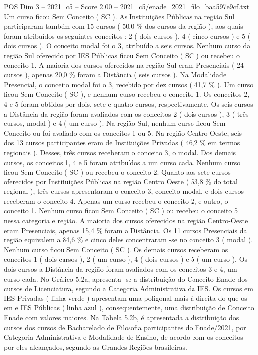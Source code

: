 \begin{textsample}{POS Dim 3 – 2021\_c5 – Score 2.00 – 2021\_c5/enade\_2021\_filo\_baa597e9cf.txt}
Um curso ficou Sem Conceito ( SC ).
As Instituições Públicas na região Sul participaram também com 15 cursos ( 50,0 \% dos cursos da região ), aos quais foram atribuídos os seguintes conceitos : 2 ( dois cursos ), 4 ( cinco cursos ) e 5 ( dois cursos ).
O conceito modal foi o 3, atribuído a seis cursos.
Nenhum curso da região Sul oferecido por IES Públicas ficou Sem Conceito ( SC ) ou recebeu o conceito 1.
A maioria dos cursos oferecidos na região Sul eram Presenciais ( 24 cursos ), apenas 20,0 \% foram a Distância ( seis cursos ).
Na Modalidade Presencial, o conceito modal foi o 3, recebido por dez cursos ( 41,7 \% ).
Um curso ficou Sem Conceito ( SC ), e nenhum curso recebeu o conceito 1.
Os conceitos 2, 4 e 5 foram obtidos por dois, sete e quatro cursos, respectivamente.
Os seis cursos a Distância da região foram avaliados com os conceitos 2 ( dois cursos ), 3 ( três cursos, modal ) e 4 ( um curso ).
Na região Sul, nenhum curso ficou Sem Conceito ou foi avaliado com os conceitos 1 ou 5.
Na região Centro Oeste, seis dos 13 cursos participantes eram de Instituições Privadas ( 46,2 \% em termos regionais ).
Desses, três cursos receberam o conceito 3, o modal.
Dos demais cursos, os conceitos 1, 4 e 5 foram atribuídos a um curso cada.
Nenhum curso ficou Sem Conceito ( SC ) ou recebeu o conceito 2.
Quanto aos sete cursos oferecidos por Instituições Públicas na região Centro Oeste ( 53,8 \% do total regional ), três cursos apresentaram o conceito 3, conceito modal, e dois cursos receberam o conceito 4.
Apenas um curso recebeu o conceito 2, e outro, o conceito 1.
Nenhum curso ficou Sem Conceito ( SC ) ou recebeu o conceito 5 nessa categoria e região.
A maioria dos cursos oferecidos na região Centro-Oeste eram Presenciais, apenas 15,4 \% foram a Distância.
Os 11 cursos Presenciais da região equivalem a 84,6 \% e cinco deles concentraram -se no conceito 3 ( modal ).
Nenhum curso ficou Sem Conceito ( SC ).
Os demais cursos receberam os conceitos 1 ( dois cursos ), 2 ( um curso ), 4 ( dois cursos ) e 5 ( um curso ).
Os dois cursos a Distância da região foram avaliados com os conceitos 3 e 4, um curso cada.
No Gráfico 5.2a, apresenta -se a distribuição do Conceito Enade dos cursos de Licenciatura, segundo a Categoria Administrativa da IES.
Os cursos em IES Privadas ( linha verde ) apresentam uma poligonal mais à direita do que os em e IES Públicas ( linha azul ), consequentemente, uma distribuição de Conceito Enade com valores maiores.
Na Tabela 5.2b, é apresentada a distribuição dos cursos dos cursos de Bacharelado de Filosofia participantes do Enade/2021, por Categoria Administrativa e Modalidade de Ensino, de acordo com os conceitos por eles alcançados, segundo as Grandes Regiões brasileiras.

\end{textsample}
